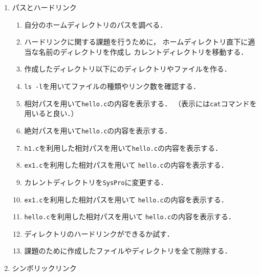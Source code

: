 \begin{enumerate}
\item パスとハードリンク
\begin{enumerate}
\item 自分のホームディレクトリのパスを調べる．
\item ハードリンクに関する課題を行うために，
ホームディレクトリ直下に適当な名前のディレクトリを作成し
カレントディレクトリを移動する．
\item 作成したディレクトリ以下にのディレクトリやファイルを作る．
\item \texttt{ls -l}を用いてファイルの種類やリンク数を確認する．
\item 相対パスを用いて\texttt{hello.c}の内容を表示する．
（表示には\texttt{cat}コマンドを用いると良い．）
\item 絶対パスを用いて\texttt{hello.c}の内容を表示する．
\item \texttt{h1.c}を利用した相対パスを用いて\texttt{hello.c}の内容を表示する．
\item \texttt{ex1.c}を利用した相対パスを用いて
\texttt{hello.c}の内容を表示する．
\item カレントディレクトリを\texttt{SysPro}に変更する．
\item \texttt{ex1.c}を利用した相対パスを用いて
\texttt{hello.c}の内容を表示する．
\item \texttt{hello.c}を利用した相対パスを用いて
\texttt{hello.c}の内容を表示する．
\item ディレクトリのハードリンクができるか試す．
\item 課題のために作成したファイルやディレクトリを全て削除する．
\end{enumerate}

\item シンボリックリンク


\end{enumerate}
